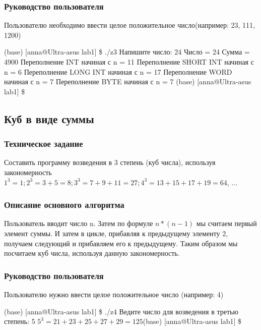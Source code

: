 \documentclass[a4paper,12pt]{extarticle}
\begin{document}
\subsubsection{Руководство пользователя}
Пользователю необходимо ввести целое положительное число(например: 23, 111, 1200)

(base) [anna@Ultra-asus lab1] \$ ./z3 \newline
Напишите число: 24\newline
Число = 24\newline
Сумма = 4900\newline
Переполнение INT начиная с n = 11\newline
Переполнение SHORT INT начиная с n = 6\newline
Переполнение LONG INT начиная с n = 17\newline
Переполнение WORD начиная с n = 7\newline
Переполнение BYTE начиная с n = 7\newline
(base) [anna@Ultra-asus lab1] \$ \newline

\subsection{Куб в виде суммы}
\subsubsection{Техническое задание}
Составить   программу   возведения   в   3   степень   (куб   числа), используя закономерность $1^3=1; 2^3=3+5=8; 3^3=7+9+11=27; 4^3=13+15+17+19=64$, ...

\subsubsection{Описание основного алгоритма}
Пользователь вводит число n. Затем по формуле $n * (n - 1)$ мы считаем первый элемент суммы. И затем в цикле, прибавляя к предыдущему элементу 2, получаем следующий и прибавляем его к предыдущему. Таким образом мы посчитаем куб числа, используя данную закономерность.

\subsubsection{Руководство пользователя}
Пользователю нужно ввести целое положительное число (например: 4)

(base) [anna@Ultra-asus lab1] \$ ./z4\newline
Ведите число для возведения в третью степень: 5\newline
$5^3 = 21+23+25+27+29 = 125$(base) [anna@Ultra-asus lab1] \$\newline
\end{document}
